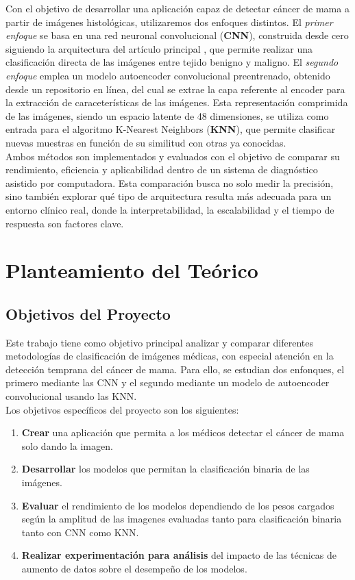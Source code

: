 \documentclass[12pt]{article} %
\begin{document}
Con el objetivo de desarrollar una aplicación capaz de detectar cáncer de mama a partir de imágenes histológicas, utilizaremos dos enfoques distintos. El \textit{primer enfoque} se basa en una red neuronal convolucional (\textbf{CNN}), construida desde cero siguiendo la arquitectura del artículo principal \cite{bardou2018classification}, que permite realizar una clasificación directa de las imágenes entre tejido benigno y maligno. El \textit{segundo enfoque} emplea un modelo autoencoder convolucional preentrenado, obtenido desde un repositorio en línea, del cual se extrae la capa referente al encoder para la extracción de caraceterísticas de las imágenes. Esta representación comprimida de las imágenes, siendo un espacio latente de 48 dimensiones, se utiliza como entrada para el algoritmo K-Nearest Neighbors (\textbf{KNN}), que permite clasificar nuevas muestras en función de su similitud con otras ya conocidas.\\

Ambos métodos son implementados y evaluados con el objetivo de comparar su rendimiento, eficiencia y aplicabilidad dentro de un sistema de diagnóstico asistido por computadora. Esta comparación busca no solo medir la precisión, sino también explorar qué tipo de arquitectura resulta más adecuada para un entorno clínico real, donde la interpretabilidad, la escalabilidad y el tiempo de respuesta son factores clave.
\\
\section{Planteamiento del Teórico}
\subsection{Objetivos del Proyecto}

Este trabajo tiene como objetivo principal analizar y comparar diferentes metodologías de clasificación de imágenes médicas, con especial atención en la detección temprana del cáncer de mama. Para ello, se estudian dos enfonques, el primero mediante las CNN y el segundo mediante un modelo de autoencoder convolucional usando las KNN.\\

Los objetivos específicos del proyecto son los siguientes:\\

\begin{enumerate}
    \item \textbf{Crear} una aplicación que permita a los médicos detectar el cáncer de mama solo dando la imagen.
    \item \textbf{Desarrollar} los modelos que permitan la clasificación binaria de las imágenes.
    \item \textbf{Evaluar} el rendimiento de los modelos dependiendo de los pesos cargados según la amplitud de las imagenes evaluadas tanto para clasificación binaria tanto con CNN como KNN.
    \item \textbf{Realizar experimentación para análisis} del  impacto de las técnicas de aumento de datos sobre el desempeño de los modelos.
\end{enumerate}
\end{document}
